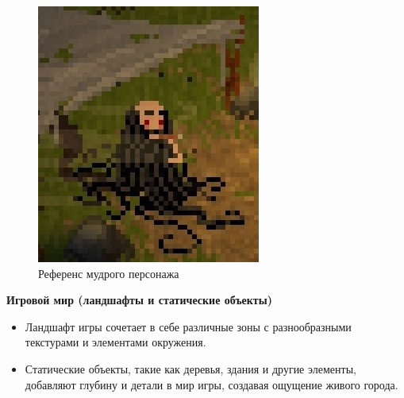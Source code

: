 \documentclass{article}
\begin{document}
\begin{figure}[h]
\begin{minipage}{0.4\textwidth}
			\includegraphics[width=\textwidth]{images/creature.jpg}
			\caption{Референс мудрого персонажа}
			\label{fig:actor2}
		\end{minipage}
	\end{figure}
	\textbf{Игровой мир (ландшафты и статические объекты)}
	\begin{itemize}
		\item Ландшафт игры сочетает в себе различные зоны с разнообразными текстурами и элементами окружения.
		\item Статические объекты, такие как деревья, здания и другие элементы, добавляют глубину и детали в мир игры, создавая ощущение живого города.
	\end{itemize}
\end{document}
